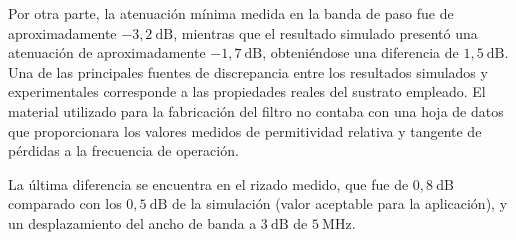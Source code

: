 Por otra parte, la atenuación mínima medida en la banda de paso fue de aproximadamente $-3{,}2~\mathrm{dB}$, mientras que el resultado simulado presentó una atenuación de aproximadamente $-1{,}7~\mathrm{dB}$, obteniéndose una diferencia de $1{,}5~\mathrm{dB}$. Una de las principales fuentes de discrepancia entre los resultados simulados y experimentales corresponde a las propiedades reales del sustrato empleado. El material utilizado para la fabricación del filtro no contaba con una hoja de datos que proporcionara los valores medidos de permitividad relativa y tangente de pérdidas a la frecuencia de operación.

La última diferencia se encuentra en el rizado medido, que fue de $0{,}8~\mathrm{dB}$ comparado con los $0{,}5~\mathrm{dB}$ de la simulación (valor aceptable para la aplicación), y un desplazamiento del ancho de banda a $3~\mathrm{dB}$ de $5~\mathrm{MHz}$.